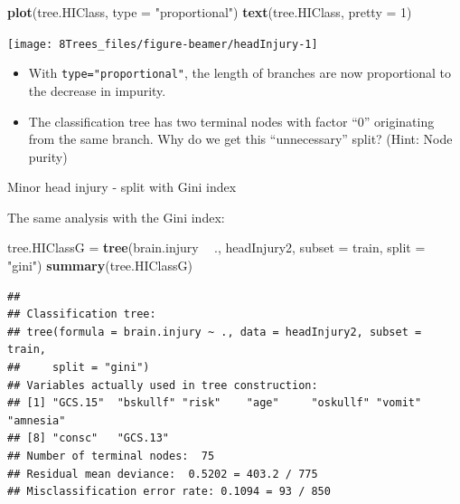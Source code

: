 \documentclass[10pt,ignorenonframetext,]{beamer}
\newenvironment{Shaded}{\begin{snugshade}}{\end{snugshade}}
\newcommand{\KeywordTok}[1]{\textcolor[rgb]{0.13,0.29,0.53}{\textbf{#1}}}
\newcommand{\DataTypeTok}[1]{\textcolor[rgb]{0.13,0.29,0.53}{#1}}
\newcommand{\DecValTok}[1]{\textcolor[rgb]{0.00,0.00,0.81}{#1}}
\newcommand{\StringTok}[1]{\textcolor[rgb]{0.31,0.60,0.02}{#1}}
\newcommand{\OperatorTok}[1]{\textcolor[rgb]{0.81,0.36,0.00}{\textbf{#1}}}
\newcommand{\NormalTok}[1]{#1}
\begin{document}
\begin{frame}[fragile]

\scriptsize

\begin{Shaded}
\begin{Highlighting}[]
\KeywordTok{plot}\NormalTok{(tree.HIClass, }\DataTypeTok{type =} \StringTok{"proportional"}\NormalTok{)}
\KeywordTok{text}\NormalTok{(tree.HIClass, }\DataTypeTok{pretty =} \DecValTok{1}\NormalTok{)}
\end{Highlighting}
\end{Shaded}

\begin{center}\texttt{[image: 8Trees\_files/figure-beamer/headInjury-1]} \end{center}

\normalsize

\begin{itemize}
\item
  With \texttt{type="proportional"}, the length of branches are now
  proportional to the decrease in impurity.
\item
  The classification tree has two terminal nodes with factor ``0''
  originating from the same branch. Why do we get this ``unnecessary''
  split? (Hint: Node purity)
\end{itemize}

\end{frame}

\begin{frame}[fragile]

\begin{block}{Minor head injury - split with Gini index}

\vspace{2mm}

The same analysis with the Gini index:

\scriptsize

\begin{Shaded}
\begin{Highlighting}[]
\NormalTok{tree.HIClassG =}\StringTok{ }\KeywordTok{tree}\NormalTok{(brain.injury }\OperatorTok{~}\StringTok{ }\NormalTok{., headInjury2, }\DataTypeTok{subset =}\NormalTok{ train, }\DataTypeTok{split =} \StringTok{"gini"}\NormalTok{)}
\KeywordTok{summary}\NormalTok{(tree.HIClassG)}
\end{Highlighting}
\end{Shaded}

\begin{verbatim}
## 
## Classification tree:
## tree(formula = brain.injury ~ ., data = headInjury2, subset = train, 
##     split = "gini")
## Variables actually used in tree construction:
## [1] "GCS.15"  "bskullf" "risk"    "age"     "oskullf" "vomit"   "amnesia"
## [8] "consc"   "GCS.13" 
## Number of terminal nodes:  75 
## Residual mean deviance:  0.5202 = 403.2 / 775 
## Misclassification error rate: 0.1094 = 93 / 850
\end{verbatim}

\end{block}

\end{frame}
\end{document}
